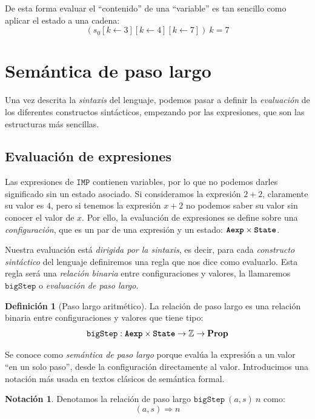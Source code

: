 \documentclass[
  a4paper, 
  10pt, 
  parskip=half, 
  toc=bibliography,
]{scrbook}
\theoremstyle{definition}
\theoremstyle{bolddef}
\newtheorem{definition}[theorem]{Definición}
\newtheorem{notation}[theorem]{Notación}
\newcommand{\funfont}[1]{\texttt{#1}}
\newcommand{\tyfont}[1]{\texttt{\textbf{#1}}}
\newcommand{\Prop}{\mathbf{Prop}}
\newcommand{\ImpName}{\texttt{IMP}}
\newcommand{\bigstep}{\Longrightarrow}
\begin{document}
De esta forma evaluar el \enquote{contenido} de una \enquote{variable} es tan
sencillo como aplicar el estado a una cadena:
\[
(s_0[k \leftarrow 3][k \leftarrow 4][k \leftarrow 7]) \ k = 7
\]

\section{Semántica de paso largo}

Una vez descrita la \emph{sintaxis} del lenguaje, podemos pasar a definir la
\emph{evaluación} de los diferentes constructos sintácticos, empezando por las
expresiones, que son las estructuras más sencillas.

\subsection{Evaluación de expresiones}

Las expresiones de \(\ImpName\) contienen
variables, por lo que no podemos darles significado sin un estado asociado. Si
consideramos la expresión \(2 + 2\), claramente su valor es \(4\), pero si
tenemos la expresión \(x + 2\) no podemos saber su valor sin conocer el
valor de \(x\). Por ello, la evaluación de expresiones se define sobre una
\emph{configuración}, que es un par de una expresión y un estado:
\(\tyfont{Aexp} \times \tyfont{State}\).

Nuestra evaluación está \emph{dirigida por la sintaxis}, es decir, para cada
\emph{constructo sintáctico} del lenguaje definiremos una regla que nos dice
como evaluarlo. Esta regla será una \emph{relación binaria} entre configuraciones
y valores, la llamaremos \(\funfont{bigStep}\) o \emph{evaluación de paso largo}.

\begin{definition}[Paso largo aritmético]
  La relación de paso largo es una relación binaria entre configuraciones y
  valores que tiene tipo:
  \[
  \funfont{bigStep} : \tyfont{Aexp} \times \tyfont{State} \to \mathbb{Z} \to \Prop
  \]  
\end{definition}

Se conoce como \emph{semántica de paso largo} porque evalúa la expresión a un
valor \enquote{en un solo paso}, desde la configuración directamente al valor.
Introducimos una notación más usada en textos clásicos de semántica formal.
\begin{notation}
  Denotamos la relación de paso largo \(\funfont{bigStep} \ (a, s) \ n\) como:
  \[
  (a, s) \bigstep n
  \]
\end{notation}
\end{document}
